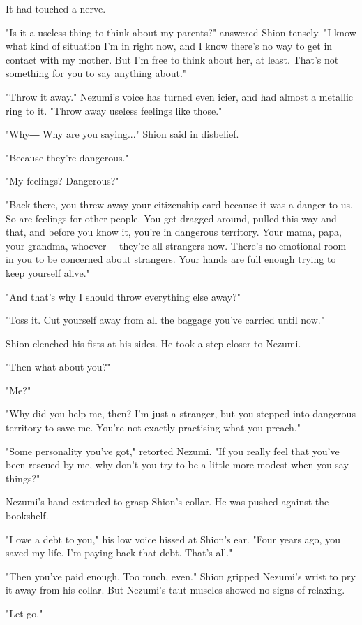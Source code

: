 It had touched a nerve.

"Is it a useless thing to think about my parents?" answered Shion
tensely. "I know what kind of situation I'm in right now, and I know
there's no way to get in contact with my mother. But I'm free to think
about her, at least. That's not something for you to say anything
about."

"Throw it away." Nezumi's voice has turned even icier, and had almost a
metallic ring to it. "Throw away useless feelings like those."

"Why― Why are you saying..." Shion said in disbelief.

"Because they're dangerous."

"My feelings? Dangerous?"

"Back there, you threw away your citizenship card because it was a
danger to us. So are feelings for other people. You get dragged around,
pulled this way and that, and before you know it, you're in dangerous
territory. Your mama, papa, your grandma, whoever― they're all strangers
now. There's no emotional room in you to be concerned about strangers.
Your hands are full enough trying to keep yourself alive."

"And that's why I should throw everything else away?"

"Toss it. Cut yourself away from all the baggage you've carried until
now."

Shion clenched his fists at his sides. He took a step closer to Nezumi.

"Then what about you?"

"Me?"

"Why did you help me, then? I'm just a stranger, but you stepped into
dangerous territory to save me. You're not exactly practising what you
preach."

"Some personality you've got," retorted Nezumi. "If you really feel that
you've been rescued by me, why don't you try to be a little more modest
when you say things?"

Nezumi's hand extended to grasp Shion's collar. He was pushed against
the bookshelf.

"I owe a debt to you," his low voice hissed at Shion's ear. "Four years
ago, you saved my life. I'm paying back that debt. That's all."

"Then you've paid enough. Too much, even." Shion gripped Nezumi's wrist
to pry it away from his collar. But Nezumi's taut muscles showed no
signs of relaxing.

"Let go."

